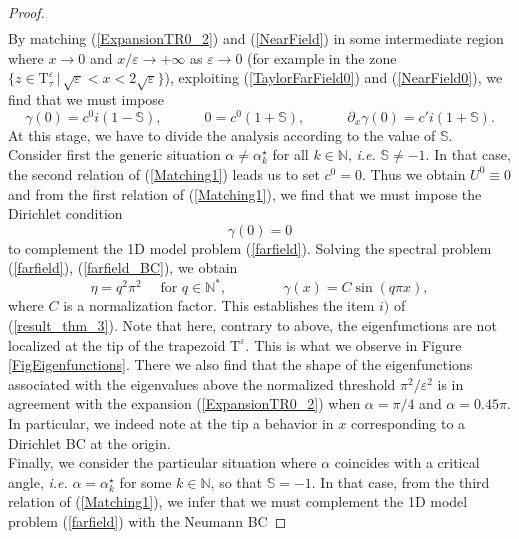 \documentclass[11pt,a4paper]{article}
\newcommand{\eps}{\varepsilon}
\newcommand{\N}{\mathbb{N}}
\begin{document}
\begin{proof}
\begin{equation}
\begin{array}{rcl}
\end{array}
\end{equation}
By matching (\ref{ExpansionTR0_2}) and (\ref{NearField}) in some intermediate region where $x\to0$ and $x/\eps\to+\infty$ as $\eps\to0$ (for example in the zone $\{z\in \mathrm{T}^\eps_\tau\,|\,\sqrt{\eps}<x<2\sqrt{\eps}\}$), exploiting (\ref{TaylorFarField0}) and (\ref{NearField0}), we find that we must impose
\begin{equation}\label{Matching1}
\gamma(0)=c^0i(1-\mathbb{S}),\qquad\quad 0=c^0(1+\mathbb{S}),\qquad\quad \partial_x\gamma(0)=c'i(1+\mathbb{S}).
\end{equation}
At this stage, we have to divide the analysis according to the value of $\mathbb{S}$.\\
\newline
Consider first the generic situation $\alpha\ne\alpha_k^\star$ for all $k\in\N$, \textit{i.e.} $\mathbb{S}\ne-1$. In that case, the second relation of (\ref{Matching1}) leads us to set $c^0=0$.
 Thus we obtain $U^0\equiv0$ and from the first relation of (\ref{Matching1}), we find that we must impose the Dirichlet condition 
\begin{equation}\label{farfield_BC}
\gamma(0)=0
\end{equation}
to complement the 1D model problem (\ref{farfield}). Solving the spectral problem (\ref{farfield}), (\ref{farfield_BC}), we obtain 
\begin{equation}\label{DefModel1DD}
\eta=q^2\pi^2 \quad\mbox{ for }q\in\N^\ast,\qquad\qquad  \gamma(x)=C \sin(q\pi x),
\end{equation}
where $C$ is a normalization factor. This establishes the item $i)$ of (\ref{result_thm_3}). Note that here, contrary to above, the eigenfunctions are not localized at the tip of the trapezoid $\mathrm{T}^\eps$. This is what we observe in Figure \ref{FigEigenfunctions}. There we also find that the shape of the eigenfunctions associated with the eigenvalues above the normalized threshold $\pi^2/\eps^2$ is in agreement with the expansion (\ref{ExpansionTR0_2}) when $\alpha=\pi/4$ and $\alpha=0.45\pi$. In particular, we indeed note at the tip a behavior in $x$ corresponding to a Dirichlet BC at the origin.\\
\newline
Finally, we consider the particular situation where $\alpha$ coincides with a critical angle, \textit{i.e.} $\alpha=\alpha_k^\star$ for some $k\in\N$, so that $\mathbb{S}=-1$. In that case, from the third relation of (\ref{Matching1}), we infer that we must complement the 1D model problem (\ref{farfield}) with the Neumann BC

\end{proof}
\end{document}
